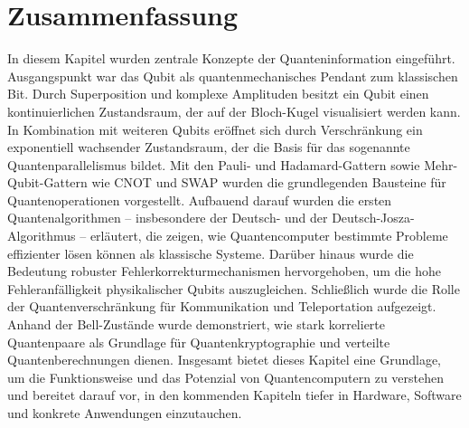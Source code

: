 \section{Zusammenfassung}
In diesem Kapitel wurden zentrale Konzepte der Quanteninformation eingeführt. Ausgangspunkt war das Qubit als quantenmechanisches Pendant zum klassischen Bit. Durch Superposition und komplexe Amplituden besitzt ein Qubit einen kontinuierlichen Zustandsraum, der auf der Bloch-Kugel visualisiert werden kann. In Kombination mit weiteren Qubits eröffnet sich durch Verschränkung ein exponentiell wachsender Zustandsraum, der die Basis für das sogenannte Quantenparallelismus bildet. Mit den Pauli- und Hadamard-Gattern sowie Mehr-Qubit-Gattern wie CNOT und SWAP wurden die grundlegenden Bausteine für Quantenoperationen vorgestellt. Aufbauend darauf wurden die ersten Quantenalgorithmen – insbesondere der Deutsch- und der Deutsch-Josza-Algorithmus – erläutert, die zeigen, wie Quantencomputer bestimmte Probleme effizienter lösen können als klassische Systeme. Darüber hinaus wurde die Bedeutung robuster Fehlerkorrekturmechanismen hervorgehoben, um die hohe Fehleranfälligkeit physikalischer Qubits auszugleichen. Schließlich wurde die Rolle der Quantenverschränkung für Kommunikation und Teleportation aufgezeigt. Anhand der Bell-Zustände wurde demonstriert, wie stark korrelierte Quantenpaare als Grundlage für Quantenkryptographie und verteilte Quantenberechnungen dienen. Insgesamt bietet dieses Kapitel eine Grundlage, um die Funktionsweise und das Potenzial von Quantencomputern zu verstehen und bereitet darauf vor, in den kommenden Kapiteln tiefer in Hardware, Software und konkrete Anwendungen einzutauchen.

\printbibliography
